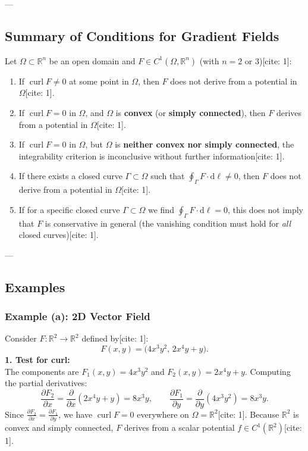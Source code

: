 ---

\subsection{Summary of Conditions for Gradient Fields}

Let $\Omega \subset \mathbb{R}^n$ be an open domain and $F \in C^1(\Omega, \mathbb{R}^n)$ (with $n = 2$ or $3$)[cite: 1]:
\begin{enumerate}[label=(\alph*)]
    \item If $\operatorname{curl} F \neq 0$ at some point in $\Omega$, then $F$ does not derive from a potential in $\Omega$[cite: 1].
    \item If $\operatorname{curl} F = 0$ in $\Omega$, and $\Omega$ is \textbf{convex} (or \textbf{simply connected}), then $F$ derives from a potential in $\Omega$[cite: 1].
    \item If $\operatorname{curl} F = 0$ in $\Omega$, but $\Omega$ is \textbf{neither convex nor simply connected}, the integrability criterion is inconclusive without further information[cite: 1].
    \item If there exists a closed curve $\Gamma \subset \Omega$ such that $\oint_{\Gamma} F \cdot \mathrm{d}\ell \neq 0$, then $F$ does not derive from a potential in $\Omega$[cite: 1].
    \item If for a specific closed curve $\Gamma \subset \Omega$ we find $\oint_{\Gamma} F \cdot \mathrm{d}\ell = 0$, this does not imply that $F$ is conservative in general (the vanishing condition must hold for \emph{all} closed curves)[cite: 1].
\end{enumerate}

---

\subsection{Examples}

\subsubsection*{Example (a): 2D Vector Field}
Consider $F \colon \mathbb{R}^2 \to \mathbb{R}^2$ defined by[cite: 1]:
\[
F(x, y) = \big(4x^3 y^2,\, 2x^4 y + y\big).
\]
\textbf{1. Test for curl:}\\
The components are $F_1(x, y) = 4x^3 y^2$ and $F_2(x, y) = 2x^4 y + y$. Computing the partial derivatives:
\[
\frac{\partial F_2}{\partial x} = \frac{\partial}{\partial x}(2x^4 y + y) = 8x^3 y, \qquad \frac{\partial F_1}{\partial y} = \frac{\partial}{\partial y}(4x^3 y^2) = 8x^3 y.
\]
Since $\frac{\partial F_2}{\partial x} = \frac{\partial F_1}{\partial y}$, we have $\operatorname{curl} F = 0$ everywhere on $\Omega = \mathbb{R}^2$[cite: 1]. Because $\mathbb{R}^2$ is convex and simply connected, $F$ derives from a scalar potential $f \in C^1(\mathbb{R}^2)$[cite: 1].

